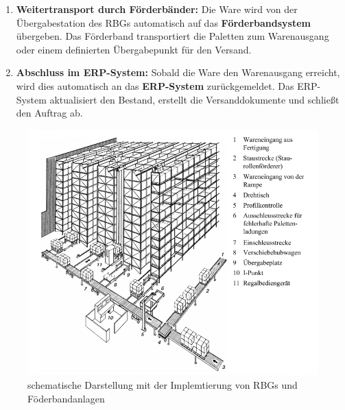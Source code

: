 \begin{enumerate}
	\item \textbf{Weitertransport durch Förderbänder:}  
	Die Ware wird von der Übergabestation des RBGs automatisch auf das \textbf{Förderbandsystem} übergeben. Das Förderband transportiert die Paletten zum Warenausgang oder einem definierten Übergabepunkt für den Versand.
	
	\item \textbf{Abschluss im ERP-System:}  
	Sobald die Ware den Warenausgang erreicht, wird dies automatisch an das \textbf{ERP-System} zurückgemeldet. Das ERP-System aktualisiert den Bestand, erstellt die Versanddokumente und schließt den Auftrag ab.
	
\end{enumerate}

\begin{figure}[H]
	\centering
	\includegraphics[width=0.7\linewidth]{images/skizze-Aufbau}
	\caption{schematische Darstellung mit der Implemtierung von RBGs und Föderbandanlagen}
	\label{fig:skizze-aufbau}
\end{figure}